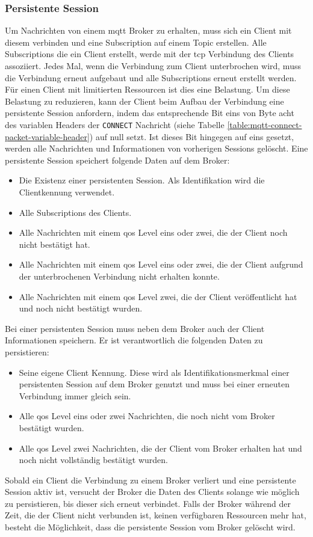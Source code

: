 \subsubsection{Persistente Session} \label{s:persistent-session}
Um Nachrichten von einem \ac{mqtt} Broker zu erhalten, muss sich ein Client mit diesem verbinden und eine Subscription auf einem Topic erstellen. Alle Subscriptions die ein Client erstellt, werde mit der \ac{tcp} Verbindung des Clients assoziiert.
Jedes Mal, wenn die Verbindung zum Client unterbrochen wird, muss die Verbindung erneut aufgebaut und alle Subscriptions erneut erstellt werden.
Für einen Client mit limitierten Ressourcen ist dies eine Belastung.
Um diese Belastung zu reduzieren, kann der Client beim Aufbau der Verbindung eine persistente Session anfordern, indem das entsprechende Bit eins von Byte acht des variablen Headers der \verb|CONNECT| Nachricht (siehe Tabelle \ref{table:mqtt-connect-packet-variable-header}) auf null setzt.
Ist dieses Bit hingegen auf eins gesetzt, werden alle Nachrichten und Informationen von vorherigen Sessions gelöscht.
Eine persistente Session speichert folgende Daten auf dem Broker:
\begin{itemize}
    \item Die Existenz einer persistenten Session. Als Identifikation wird die Clientkennung verwendet.
    \item Alle Subscriptions des Clients.
    \item Alle Nachrichten mit einem \ac{qos} Level eins oder zwei, die der Client noch nicht bestätigt hat.
    \item Alle Nachrichten mit einem \ac{qos} Level eins oder zwei, die der Client aufgrund der unterbrochenen Verbindung nicht erhalten konnte.
    \item Alle Nachrichten mit einem \ac{qos} Level zwei, die der Client veröffentlicht hat und noch nicht bestätigt wurden.
\end{itemize}
Bei einer persistenten Session muss neben dem Broker auch der Client Informationen speichern. Er ist verantwortlich die folgenden Daten zu persistieren:
\begin{itemize}
    \item Seine eigene Client Kennung. Diese wird als Identifikationsmerkmal einer persistenten Session auf dem Broker genutzt und muss bei einer erneuten Verbindung immer gleich sein.
    \item Alle \ac{qos} Level eins oder zwei Nachrichten, die noch nicht vom Broker bestätigt wurden.
    \item Alle \ac{qos} Level zwei Nachrichten, die der Client vom Broker erhalten hat und noch nicht vollständig bestätigt wurden.
\end{itemize}
Sobald ein Client die Verbindung zu einem Broker verliert und eine persistente Session aktiv ist, versucht der Broker die Daten des Clients solange wie möglich zu persistieren, bis dieser sich erneut verbindet. Falls der Broker während der Zeit, die der Client nicht verbunden ist, keinen verfügbaren Ressourcen mehr hat, besteht die Möglichkeit, dass die persistente Session vom Broker gelöscht wird.
\cite{teamPersistentSessionQueuing}

